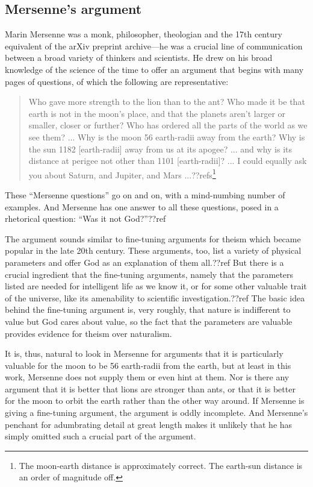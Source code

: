 \subsection{Mersenne's argument}
Marin Mersenne was a monk, philosopher, theologian and the 17th century equivalent of the arXiv preprint archive---he was 
a crucial line of communication between a broad variety of thinkers and scientists. He drew on his broad knowledge of
the science of the time to offer an argument that begins with many pages of questions, of which the following are
representative:
\begin{quote}
Who gave more strength to the lion than to the ant?
Who made it be that earth is not in the moon's place, and that the planets aren't larger or smaller, closer or further?
Who has ordered all the parts of the world as we see them?
...
Why is the moon 56 earth-radii away from the earth? Why is the sun 1182 [earth-radii] away from us at its apogee? ... and why is its distance at perigee not other than 1101 [earth-radii]? ...
I could equally ask you about Saturn, and Jupiter, and Mars ...??refs\footnote{The moon-earth distance is approximately correct.
The earth-sun distance is an order of magnitude off.}
\end{quote}
These ``Mersenne questions'' go on and on, with a mind-numbing number of examples. And Mersenne has one answer to all
these questions, posed in a rhetorical question: ``Was it not God?''??ref

The argument sounds similar to fine-tuning arguments for theism which became popular in the late 20th century. These
arguments, too, list a variety of physical parameters and offer God as an explanation of them all.??ref But there is
a crucial ingredient that the fine-tuning arguments, namely that the parameters listed are needed for intelligent life
as we know it, or for some other valuable trait of the universe, like its amenability to scientific investigation.??ref
The basic idea behind the fine-tuning argument is, very roughly, that nature is indifferent to value but God cares 
about value, so the fact that the parameters are valuable provides evidence for theism over naturalism.

It is, thus, natural to look in Mersenne for arguments that it is particularly valuable for the moon to be 56 earth-radii
from the earth, but at least in this work, Mersenne does not supply them or even hint at them. Nor is there any argument
that it is better that lions are stronger than ants, or that it is better for the moon to orbit the earth rather than
the other way around. If Mersenne is giving a fine-tuning argument, the argument is oddly incomplete. And Mersenne's
penchant for adumbrating detail at great length makes it unlikely that he has simply omitted such a crucial part of the
argument.

